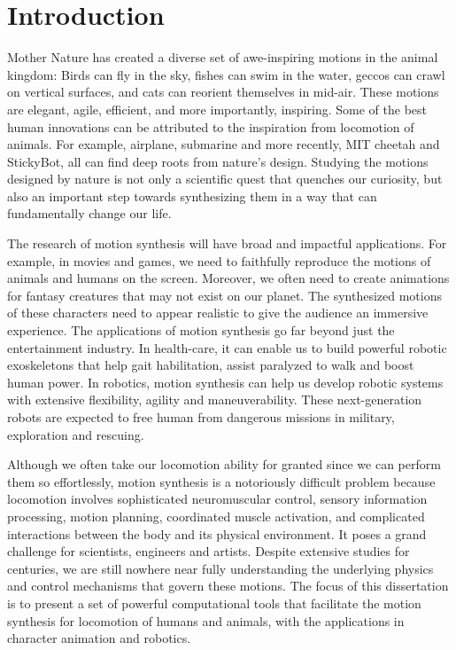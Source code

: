 \section{Introduction}


Mother Nature has created a diverse set of awe-inspiring motions in the animal kingdom: Birds can fly in the sky, fishes can swim in the water, geccos can crawl on vertical surfaces, and cats can reorient themselves in mid-air. These motions are elegant, agile, efficient, and more importantly, inspiring. Some of the best human innovations can be attributed to the inspiration from locomotion of animals. For example, airplane, submarine and more recently, MIT cheetah and StickyBot, all can find deep roots from nature's design. Studying the motions designed by nature is not only a scientific quest that quenches our curiosity, but also an important step towards synthesizing them in a way that can fundamentally change our life.

The research of motion synthesis will have broad and impactful applications. For example, in movies and games, we need to faithfully reproduce the motions of animals and humans on the screen. Moreover, we often need to create animations for fantasy creatures that may not exist on our planet. The synthesized motions of these characters need to appear realistic to give the audience an immersive experience. The applications of motion synthesis go far beyond just the entertainment industry. In health-care, it can enable us to build powerful robotic exoskeletons that help gait habilitation, assist paralyzed to walk and boost human power. In robotics, motion synthesis can help us develop robotic systems with extensive flexibility, agility and maneuverability. These next-generation robots are expected to free human from dangerous missions in military, exploration and rescuing. 

Although we often take our locomotion ability for granted since we can perform them so effortlessly, motion synthesis is a notoriously difficult problem because locomotion involves sophisticated neuromuscular control, sensory information processing, motion planning, coordinated muscle activation, and complicated interactions between the body and its physical environment. It poses a grand challenge for scientists, engineers and artists. Despite extensive studies for centuries, we are still nowhere near fully understanding the underlying physics and control mechanisms that govern these motions. The focus of this dissertation is to present a set of powerful computational tools that facilitate the motion synthesis for locomotion of humans and animals, with the applications in character animation and robotics.

